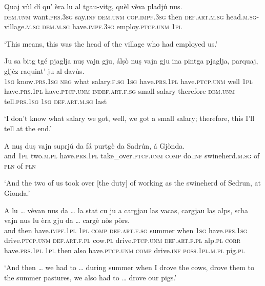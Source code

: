 \begin{linenumbers}
	\gll    Quaj vùl dí qu’ èra lu al tgau-vitg, quèl vèva pladjú nus.\\
	\textsc{dem.unm} want.\textsc{prs.3sg} say.\textsc{inf} \textsc{dem.unm} \textsc{cop.impf.3sg} then \textsc{def.art.m.sg} head.\textsc{m.sg}-village.\textsc{m.sg} \textsc{dem.m.sg} have.\textsc{impf.3sg} employ.\textsc{ptcp.unm} \textsc{1pl}  \textsc{}  \textsc{}  \textsc{}  \textsc{}  \textsc{} \\
\end{linenumbers}
\medskip
\glt `This means, this was the head of the village who had employed us.'
\medskip

\begin{linenumbers}
	\gll    Ju sa bitg tgé pjaglja nuṣ vajn gju, álṣò nuṣ vajn gju ina pintga pjaglja, parquaj, gljèz raquint' ju al davùs.\\
	\textsc{1sg} know.\textsc{prs.1sg} \textsc{neg} what  salary.\textsc{f.sg}  \textsc{1sg}  have.\textsc{prs.1pl} have.\textsc{ptcp.unm} well \textsc{1pl} have.\textsc{prs.1pl}  have.\textsc{ptcp.unm} \textsc{indef.art.f.sg} small salary therefore \textsc{dem.unm} tell.\textsc{prs.1sg} \textsc{1sg} \textsc{def.art.m.sg} last \\
\end{linenumbers}
\medskip
\glt `I don’t know what salary we got, well, we got a small salary; therefore, this I’ll tell at the end.'
\medskip

\begin{linenumbers}
	\gll    A nuṣ duṣ vajn suprjú da fá purtgè da Sadrún, á Gjònda.\\
	and \textsc{1pl} two.\textsc{m.pl} have.\textsc{prs.1pl} take\_over.\textsc{ptcp.unm}  \textsc{comp} do.\textsc{inf}  swineherd.\textsc{m.sg} of  \textsc{pln} of \textsc{pln}\\
\end{linenumbers}
\medskip
\glt `And the two of us took over [the duty] of working as the swineherd of Sedrun, at Gionda.'
\medskip

\begin{linenumbers}
	\gll    A lu … vèvan nus da … la stat cu ju a cargjau las vacas, cargjau laṣ alps, scha vajn nus lu èra gju da … cargè nòs pòrs.\\
	and then {} have.\textsc{impf.1pl} \textsc{1pl}  \textsc{comp} {} \textsc{def.art.f.sg} summer when  \textsc{1sg} have.\textsc{prs.1sg} drive.\textsc{ptcp.unm} \textsc{def.art.f.pl} cow.\textsc{pl} drive.\textsc{ptcp.unm} \textsc{def.art.f.pl} alp.\textsc{pl} \textsc{corr} have.\textsc{prs.1pl} \textsc{1pl} then also have.\textsc{ptcp.unm} \textsc{comp} {} drive.\textsc{inf} {} \textsc{poss.1pl.m.pl} pig.\textsc{pl}\\
\end{linenumbers}
\medskip
\glt `And then … we had to … during summer when I drove the cows, drove them to the summer pastures, we also had to … drove our pigs.'
\medskip

